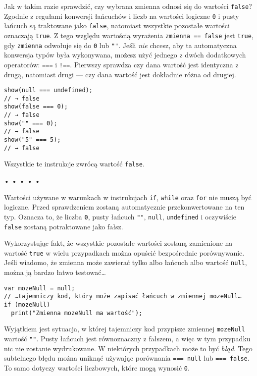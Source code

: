     
Jak w takim razie sprawdzić, czy wybrana zmienna odnosi się do wartości \texttt{false}? Zgodnie z regułami konwersji łańcuchów i liczb na wartości logiczne \texttt{0} i pusty łańcuch są traktowane jako \texttt{false}, natomiast wszystkie pozostałe wartości oznaczają \texttt{true}. Z tego względu wartością wyrażenia \texttt{zmienna == false} jest \texttt{true}, gdy \texttt{zmienna} odwołuje się do \texttt{0} lub \texttt{""}. Jeśli \emph{nie} chcesz, aby ta automatyczna konwersja typów była wykonywana, możesz użyć jednego z dwóch dodatkowych operatorów: \texttt{===}\index{===} i \texttt{!==}\index{!==}. Pierwszy sprawdza czy dana wartość jest identyczna z drugą, natomiast drugi — czy dana wartość jest dokładnie różna od drugiej.

\begin{verbatim} 
show(null === undefined);
// → false
show(false === 0);
// → false
show("" === 0);
// → false
show("5" === 5);
// → false
\end{verbatim}
    
Wszystkie te instrukcje zwrócą wartość \texttt{false}.

  
\begin{center}
• • • • •
\end{center}
  
    
Wartości używane w warunkach w instrukcjach \texttt{if}, \texttt{while} oraz \texttt{for} nie muszą być logiczne. Przed sprawdzeniem zostaną automatycznie przekonwertowane na ten typ. Oznacza to, że liczba \texttt{0}, pusty łańcuch \texttt{""}, \texttt{null}, \texttt{undefined} i oczywiście \texttt{false} zostaną potraktowane jako fałsz.

    
Wykorzystując fakt, że wszystkie pozostałe wartości zostaną zamienione na wartość \texttt{true} w wielu przypadkach można opuścić bezpośrednie porównywanie. Jeśli wiadomo, że zmienna może zawierać tylko albo łańcuch albo wartość \texttt{null}, można ją bardzo łatwo testować…

\begin{verbatim} 
var mozeNull = null;
// …tajemniczy kod, który może zapisać łańcuch w zmiennej mozeNull…
if (mozeNull)
  print("Zmienna mozeNull ma wartość");
\end{verbatim}
    
Wyjątkiem jest sytuacja, w której tajemniczy kod przypisze zmiennej \texttt{mozeNull} wartość \texttt{""}. Pusty łańcuch jest równoznaczny z fałszem, a więc w tym przypadku nic nie zostanie wydrukowane. W niektórych przypadkach może to być \emph{błąd}. Tego subtelnego błędu można uniknąć używając porównania \texttt{=== null} lub \texttt{=== false}. To samo dotyczy wartości liczbowych, które mogą wynosić \texttt{0}.

